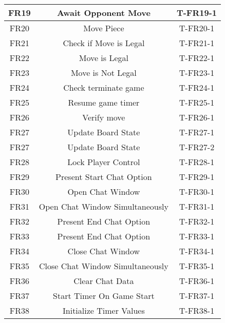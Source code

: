\documentclass[12pt, titlepage]{article}
\begin{document}
\begin{center}
\begin{longtable}{ |c|c|c| }
        \hline
        FR19    & Await Opponent Move                   & T-FR19-1 \\ 
        \hline
        FR20    & Move Piece                            & T-FR20-1 \\ 
        \hline
        FR21    & Check if Move is Legal                & T-FR21-1 \\ 
        \hline
        FR22    & Move is Legal                         & T-FR22-1 \\ 
        \hline
        FR23    & Move is Not Legal                     & T-FR23-1 \\ 
        \hline
        FR24    & Check terminate game                  & T-FR24-1 \\ 
        \hline
        FR25    & Resume game timer                     & T-FR25-1 \\ 
        \hline
        FR26    & Verify move                           & T-FR26-1 \\ 
        \hline
        FR27    & Update Board State                    & T-FR27-1 \\ 
        FR27    & Update Board State                    & T-FR27-2 \\ 
        \hline
        FR28    & Lock Player Control                   & T-FR28-1 \\ 
        \hline
        FR29    & Present Start Chat Option             & T-FR29-1 \\ 
        \hline
        FR30    & Open Chat Window                      & T-FR30-1 \\ 
        \hline
        FR31    & Open Chat Window Simultaneously       & T-FR31-1 \\ 
        \hline
        FR32    & Present End Chat Option               & T-FR32-1 \\ 
        \hline
        FR33    & Present End Chat Option               & T-FR33-1 \\ 
        \hline
        FR34    & Close Chat Window                     & T-FR34-1 \\ 
        \hline
        FR35    & Close Chat Window Simultaneously      & T-FR35-1 \\ 
        \hline
        FR36    & Clear Chat Data                       & T-FR36-1 \\ 
        \hline
        FR37    & Start Timer On Game Start             & T-FR37-1 \\ 
        \hline
        FR38    & Initialize Timer Values               & T-FR38-1 \\ 

\end{longtable}
\end{center}
\end{document}
